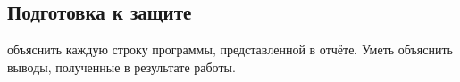 { %
	\subsection{Подготовка к защите}
	 объяснить каждую строку программы, представленной в отчёте. Уметь объяснить выводы, полученные в результате работы.
	\par
}